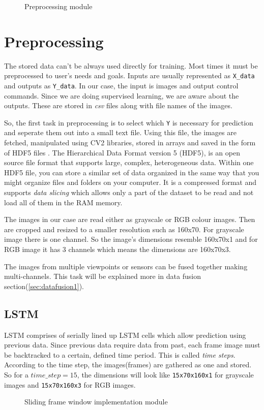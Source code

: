 \begin{figure}
	\centering
    \def\svgwidth{0.6\textwidth}
    \caption{Preprocessing module}
    \label{fig:preprocessing}
\end{figure}

\newpage
\section{Preprocessing}
The stored data can't be always used directly for training. Most times it must be
preprocessed to user's needs and goals.
Inputs are usually represented as \texttt{X\_{data}} and outputs as \texttt{Y\_{data}}. In our case, the input is images and output control commands.
Since we are doing supervised learning, we are aware about the outputs. These are stored in
\textit{csv} files along with file names of the images.

So, the first task in preprocessing is to select which \texttt{Y} is necessary for prediction
and seperate them out into a small text file. Using this file, the images are fetched,
manipulated using CV2 libraries, stored in arrays and saved in the form of HDF5 files
\cite{hdf5file}. The Hierarchical Data Format version 5 (HDF5), is an open source file format
that supports large, complex, heterogeneous data. Within one HDF5 file, you can store a similar set of data organized in the same way that you might organize files and folders on your computer.
It is a compressed format and supports \textit{data slicing} which allows only a part of
the dataset to be read and not load all of them in the RAM memory.

The images in our case are read either as grayscale or RGB colour images. Then are cropped
and resized to a smaller resolution such as 160x70. For grayscale image there is one
channel. So the image's dimensions resemble 160x70x1 and for RGB image it has 3 channels
which means the dimensions are 160x70x3.

The images from multiple viewpoints or sensors can be fused together making
multi-channels. This task will be explained more in data fusion
section(\ref{sec:datafusion1}).

\subsection{LSTM}


LSTM comprises of serially lined up LSTM cells which allow prediction using previous
data. Since previous data require data from past, each frame image must be backtracked to
a certain, defined time period. This is called \textit{time steps}. According to the time
step, the images(frames) are gathered as one and stored. So for a $time\_step = 15$, the
dimensions will look like \texttt{15x70x160x1} for grayscale images and \texttt{15x70x160x3} for RGB
images.
\begin{figure}[h]
	\centering
    \def\svgwidth{0.8\textwidth}
    \caption{Sliding frame window implementation module}
    \label{fig:slidingwindow}
\end{figure}

